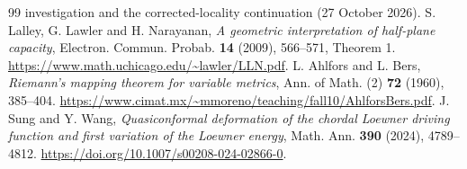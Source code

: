 \documentclass[11pt]{article}
\theoremstyle{definition}\newtheorem{definition}[theorem]{Definition}
\theoremstyle{remark}\newtheorem{remark}[theorem]{Remark}
\begin{document}
\begin{thebibliography}{99}
investigation and the corrected-locality continuation (27 October 2026).
 S. Lalley, G. Lawler and H. Narayanan,
\emph{A geometric interpretation of half-plane capacity},
Electron. Commun. Probab. \textbf{14} (2009), 566--571, Theorem 1.
\url{https://www.math.uchicago.edu/~lawler/LLN.pdf}.
 L. Ahlfors and L. Bers,
\emph{Riemann's mapping theorem for variable metrics},
Ann. of Math. (2) \textbf{72} (1960), 385--404.
\url{https://www.cimat.mx/~mmoreno/teaching/fall10/AhlforsBers.pdf}.
 J. Sung and Y. Wang,
\emph{Quasiconformal deformation of the chordal Loewner driving
function and first variation of the Loewner energy},
Math. Ann. \textbf{390} (2024), 4789--4812.
\url{https://doi.org/10.1007/s00208-024-02866-0}.
\end{thebibliography}
\end{document}

